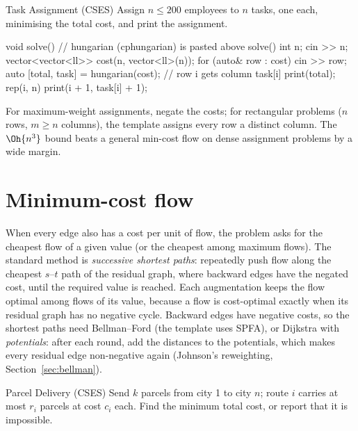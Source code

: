 \begin{problem}{Task Assignment (CSES)}
Assign $n \le 200$ employees to $n$ tasks, one each, minimising the total cost, and print the assignment.
\end{problem}

\begin{code}
void solve() {  // hungarian (cphungarian) is pasted above solve()
    int n;
    cin >> n;
    vector<vector<ll>> cost(n, vector<ll>(n));
    for (auto& row : cost) cin >> row;
    auto [total, task] = hungarian(cost);  // row i gets column task[i]
    print(total);
    rep(i, n) print(i + 1, task[i] + 1);
}
\end{code}


For maximum-weight assignments, negate the costs; for rectangular problems ($n$ rows, $m \ge n$ columns), the template assigns every
row a distinct column. The $\Oh{n^3}$ bound beats a general min-cost flow on dense assignment problems by a wide margin.

\section[Minimum-cost flow]{Minimum-cost flow \hfill \ioi}\label{sec:mcmf}

When every edge also has a cost per unit of flow, the  problem asks for the cheapest flow of a given value
(or the cheapest among maximum flows). The standard method is \emph{successive shortest paths}: repeatedly push flow along the
cheapest $s$--$t$ path of the residual graph, where backward edges have the negated cost, until the required value is reached.
Each augmentation keeps the flow optimal among flows of its value, because a flow is cost-optimal exactly when its residual graph
has no negative cycle. Backward edges have negative costs, so the shortest paths need Bellman--Ford (the template uses SPFA), or
Dijkstra with \emph{potentials}: after each round, add the distances to the potentials, which makes every residual edge
non-negative again (Johnson's reweighting, Section~\ref{sec:bellman}).

\begin{problem}{Parcel Delivery (CSES)}
Send $k$ parcels from city 1 to city $n$; route $i$ carries at most $r_i$ parcels at cost $c_i$ each. Find the minimum total cost,
or report that it is impossible.
\end{problem}

